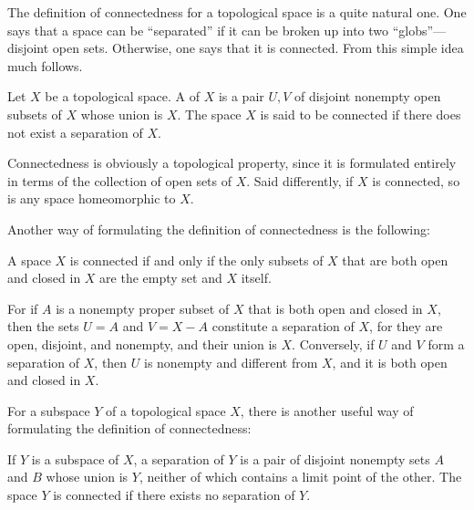 
The definition of connectedness for a topological space is a quite natural one. One says that a space can be ``separated'' if it can be broken up into two ``globs''—disjoint open sets. Otherwise, one says that it is connected. From this simple idea much follows.

\begin{definition}
 Let \(X\) be a topological space. A  of \(X\) is a pair \(U,V\) of disjoint nonempty open subsets of \(X\) whose union is \(X\). The space \(X\) is said to be connected if there does not exist a separation of \(X\).
\end{definition}

Connectedness is obviously a topological property, since it is formulated entirely in terms of the collection of open sets of \(X\). Said differently, if \(X\) is connected, so is any space homeomorphic to \(X\).

Another way of formulating the definition of connectedness is the following:

A space \(X\) is connected if and only if the only subsets of \(X\) that are both open and closed in \(X\) are the empty set and \(X\) itself.

For if \(A\) is a nonempty proper subset of \(X\) that is both open and closed in \(X\), then the sets \(U = A\) and \(V = X - A\) constitute a separation of \(X\), for they are open, disjoint, and nonempty, and their union is \(X\). Conversely, if \(U\) and \(V\) form a separation of \(X\), then \(U\) is nonempty and different from \(X\), and it is both open and closed in \(X\).

For a subspace \(Y\) of a topological space \(X\), there is another useful way of formulating the definition of connectedness:

\begin{lemma}
\label{lem:\thetheorem}
 If \(Y\) is a subspace of \(X\), a separation of \(Y\) is a pair of disjoint nonempty sets \(A\) and \(B\) whose union is \(Y\), neither of which contains a limit point of the other. The space \(Y\) is connected if there exists no separation of \(Y\).
\end{lemma}

